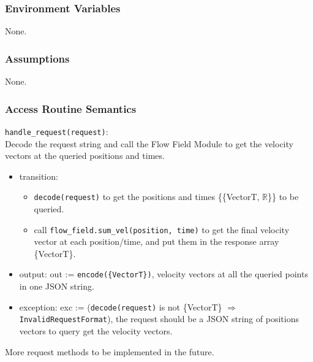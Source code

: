 \documentclass[12pt, titlepage]{article}
\begin{document}
\subsubsection{Environment Variables}
None.

\subsubsection{Assumptions}
None.

\subsubsection{Access Routine Semantics}

\noindent \texttt{handle\_request(request)}:\\
Decode the request string and call the Flow Field Module to get the velocity vectors at the queried positions and times.
\begin{itemize}
\item transition:
  \begin{itemize}
    \item \texttt{decode(request)} to get the positions and times \{\{VectorT, $\mathbb{R}$\}\} to be queried.
    \item call \texttt{flow\_field.sum\_vel(position, time)} to get the final velocity vector at each position/time, and put them in the response array \{VectorT\}.
  \end{itemize}
\item output: out := \texttt{encode(\{VectorT\})}, velocity vectors at all the queried points in one JSON string.
\item exception: exc := (\texttt{decode(request)} is not \{VectorT\} $\Rightarrow$ \texttt{InvalidRequestFormat}), the request should be a JSON string of positions vectors to query get the velocity vectors.
\end{itemize}
\noindent More request methods to be implemented in the future.

\end{document}
